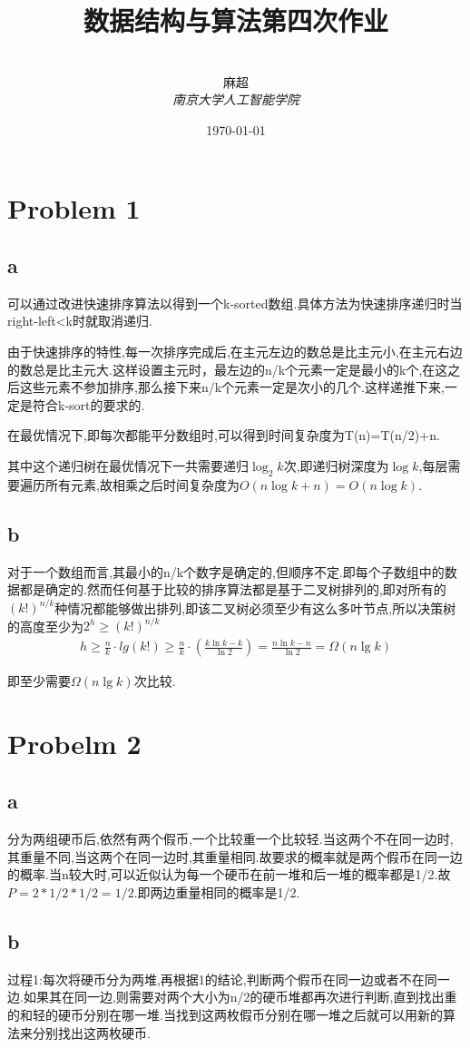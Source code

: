 \documentclass[12pt,a4paper,fontset=none]{ctexart}
\title{\textbf{数据结构与算法第四次作业}}
\author{
\\
\Large{麻超 \quad 201300066}
\\[6pt]
{ \large \textit{南京大学人工智能学院}}\\[2pt]
}
\date{\today}
\begin{document}
\maketitle
\setcounter{page}{1}
\section*{Problem 1}
\subsection*{a}
可以通过改进快速排序算法以得到一个k-sorted数组.具体方法为快速排序递归时当right-left<k时就取消递归.

由于快速排序的特性,每一次排序完成后,在主元左边的数总是比主元小,在主元右边的数总是比主元大.这样设置主元时，最左边的n/k个元素一定是最小的k个,在这之后这些元素不参加排序,那么接下来n/k个元素一定是次小的几个.这样递推下来,一定是符合k-sort的要求的.

在最优情况下,即每次都能平分数组时,可以得到时间复杂度为T(n)=T(n/2)+n.

其中这个递归树在最优情况下一共需要递归$\log_2 k$次,即递归树深度为$\log k$,每层需要遍历所有元素,故相乘之后时间复杂度为$O(n\log k+n)=O(n\log k)$.
\subsection*{b}
对于一个数组而言,其最小的n/k个数字是确定的,但顺序不定.即每个子数组中的数据都是确定的.然而任何基于比较的排序算法都是基于二叉树排列的,即对所有的$(k!)^{n/k}$种情况都能够做出排列,即该二叉树必须至少有这么多叶节点,所以决策树的高度至少为$2^h\geq (k!)^{n/k}$
\begin{align*}
	h\geq \frac{n}{k}\cdot lg(k!)\geq \frac{n}{k}\cdot (\frac{k\ln k-k}{\ln 2} )=\frac{n\ln k-n}{\ln 2}=\Omega(n\lg k)
\end{align*}

即至少需要$\Omega(n\lg k)$次比较.
\section*{Probelm 2}
\subsection*{a}
分为两组硬币后,依然有两个假币,一个比较重一个比较轻.当这两个不在同一边时,其重量不同,当这两个在同一边时,其重量相同.故要求的概率就是两个假币在同一边的概率.当n较大时,可以近似认为每一个硬币在前一堆和后一堆的概率都是1/2.故$P=2*1/2*1/2=1/2$.即两边重量相同的概率是1/2.
\subsection*{b}
过程1:每次将硬币分为两堆,再根据1的结论,判断两个假币在同一边或者不在同一边.如果其在同一边,则需要对两个大小为n/2的硬币堆都再次进行判断,直到找出重的和轻的硬币分别在哪一堆.当找到这两枚假币分别在哪一堆之后就可以用新的算法来分别找出这两枚硬币.
\end{document}
